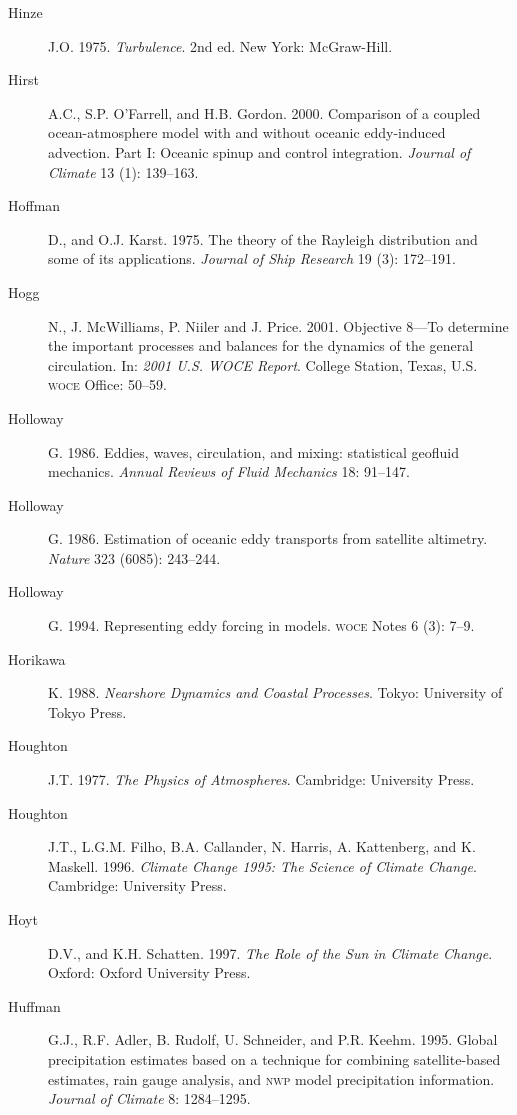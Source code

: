 \begin{description}
\item [Hinze]J.O. 1975. \textit{Turbulence}. 2nd ed. New York: McGraw-Hill.

\item [Hirst]A.C., S.P. O'Farrell, and H.B. Gordon. 2000. Comparison of a
coupled ocean-atmosphere model with and without oceanic eddy-induced advection.
Part I: Oceanic spinup and control integration. \textit{Journal of Climate} 13
(1): 139--163.

\item [Hoffman]D., and O.J. Karst. 1975. The theory of the Rayleigh distribution
and some of its applications. \textit{Journal of Ship Research} 19 (3): 172--191.

\item [Hogg]N., J. McWilliams, P. Niiler and J. Price. 2001. Objective 8---To
determine the important processes and balances for the dynamics of the general
circulation. In: \textit{2001 U.S. WOCE Report}. College Station, Texas, U.S. \textsc{woce}
Office: 50--59.

\item [Holloway]G. 1986. Eddies, waves, circulation, and mixing:
statistical geofluid mechanics. \textit{Annual Reviews of Fluid Mechanics} 18:
91--147.

\item [Holloway]G. 1986. Estimation of oceanic eddy transports from satellite
altimetry. \textit{Nature} 323 (6085): 243--244.

\item [Holloway]G. 1994. Representing eddy forcing in models. \textsc{woce} Notes
6 (3): 7--9.

\item [Horikawa]K. 1988. \textit{Nearshore Dynamics and Coastal Processes}.
Tokyo: University of Tokyo Press.

\item [Houghton]J.T. 1977. \textit{The Physics of Atmospheres}. Cambridge: University Press.

\item [Houghton]J.T., L.G.M. Filho, B.A. Callander, N. Harris, A. Kattenberg,
and K. Maskell. 1996. \textit{Climate Change 1995: The Science of Climate
Change}. Cambridge: University Press.

\item [Hoyt]D.V., and K.H. Schatten. 1997. \textit{The Role of the Sun in Climate
Change}.  Oxford: Oxford University Press.

\item [Huffman]G.J., R.F. Adler, B. Rudolf, U. Schneider, and P.R. Keehm. 1995.
Global precipitation estimates based on a technique for combining
satellite-based estimates, rain gauge analysis, and \textsc{nwp} model
precipitation information. \textit{Journal of Climate} 8: 1284--1295.


\end{description}
